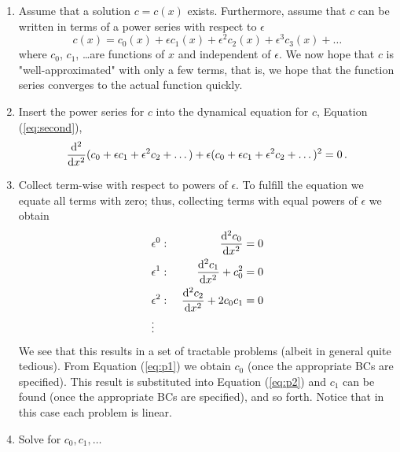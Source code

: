 \begin{enumerate}
\item{Assume that a solution $c=c(x)$ exists. Furthermore, assume that $c$ can
    be written in terms of a power series with respect to $\epsilon$
    \begin{equation}
      \label{eq:pertass1}
		c(x) = c_0(x) + \epsilon c_1(x) + \epsilon^2 c_2(x) + \epsilon^3c_3(x) + \ldots
    \end{equation}
    where $c_0$, $c_1$, \ldots are functions of $x$ and independent of
    $\epsilon$. We now hope that $c$ is "well-approximated" with only a 
    few terms, that is, we hope that the function series converges to
    the actual function quickly.
		}
\item{ 
    Insert the power series for $c$ into the dynamical equation for $c$,
    Equation (\ref{eq:second}),
    \begin{eqnarray}
      \frac{\mathrm{d}^2}{\mathrm{d} x^2} (c_0 + \epsilon c_1 + \epsilon^2 c_2 + \dots) +
      \epsilon(c_0 + \epsilon c_1 + \epsilon^2 c_2 + \dots)^2 = 0  \, .
    \end{eqnarray}
  }
\item{
    Collect term-wise with respect to powers of $\epsilon$. To fulfill the
	equation we equate all terms with zero; thus, collecting terms with equal powers of $\epsilon$ 
	 we obtain 	
    \begin{eqnarray}
      &\epsilon^0:& \ \frac{\mathrm{d}^2 c_0}{\mathrm{d} x^2} = 0 \label{eq:p1}\\
      &\epsilon^1:& \ \frac{\mathrm{d}^2 c_1}{\mathrm{d} x^2} + c_0^2 = 0  \label{eq:p2}
      \\
      &\epsilon^2:& \ \frac{\mathrm{d}^2 c_2}{\mathrm{d} x^2} + 2c_0c_1 = 0 \\
      &\vdots& \nonumber
    \end{eqnarray}
	We see that this results in a set of tractable problems (albeit in general quite tedious).
    From Equation (\ref{eq:p1}) we obtain $c_0$ (once the appropriate BCs are specified). This
    result is substituted into Equation (\ref{eq:p2}) and $c_1$ can be found
    (once the appropriate BCs are specified), and so
    forth. Notice that in this case each problem is linear.
  }
\item{
	Solve for $c_0, c_1, \ldots$
    
}
\end{enumerate}
